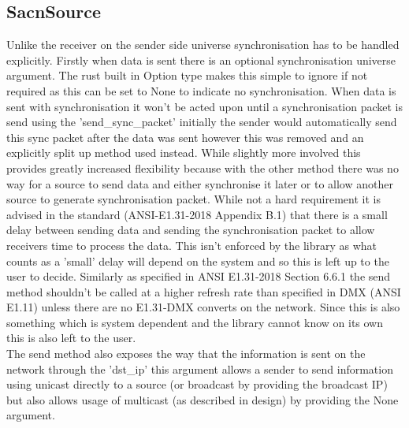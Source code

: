 \documentclass[11pt,a4paper]{report}
\begin{document}
\subsection{SacnSource}
Unlike the receiver on the sender side universe synchronisation has to be handled explicitly. Firstly when data is sent there is an optional synchronisation universe argument. The rust built in Option type makes this simple to ignore if not required as this can be set to None to indicate no synchronisation. When data is sent with synchronisation it won't be acted upon until a synchronisation packet is send using the 'send\_sync\_packet' initially the sender would automatically send this sync packet after the data was sent however this was removed and an explicitly split up method used instead. While slightly more involved this provides greatly increased flexibility because with the other method there was no way for a source to send data and either synchronise it later or to allow another source to generate synchronisation packet. While not a hard requirement it is advised in the standard (ANSI-E1.31-2018 Appendix B.1) that there is a small delay between sending data and sending the synchronisation packet to allow receivers time to process the data. This isn't enforced by the library as what counts as a 'small' delay will depend on the system and so this is left up to the user to decide. Similarly as specified in ANSI E1.31-2018 Section 6.6.1 the send method shouldn't be called at a higher refresh rate than specified in DMX (ANSI E1.11) unless there are no E1.31-DMX converts on the network. Since this is also something which is system dependent and the library cannot know on its own this is also left to the user.\\
	
The send method also exposes the way that the information is sent on the network through the 'dst\_ip' this argument allows a sender to send information using unicast directly to a source (or broadcast by providing the broadcast IP) but also allows usage of multicast (as described in design) by providing the None argument. \\
	
\end{document}
